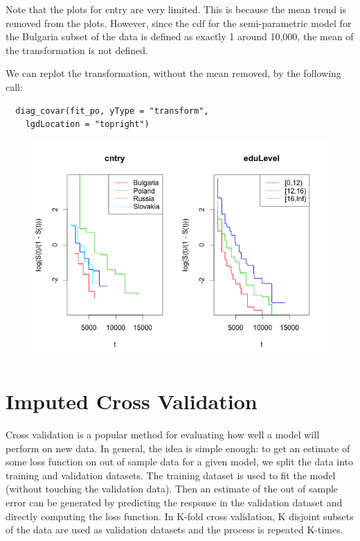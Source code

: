 \documentclass[11pt]{report}
\begin{document}
  Note that the plots for cntry are very limited. This is 
  because the mean trend is removed from the plots. However,
  since the cdf for the semi-parametric model for the 
  Bulgaria subset of the data is defined as exactly 1 around 
  10,000, the mean of the transformation is not defined. 
  
  We can replot the transformation, without the mean removed,
  by the following call:
  
  \begin{verbatim}
  diag_covar(fit_po, yType = "transform",
    lgdLocation = "topright")
  \end{verbatim}

  \begin{figure}
  \includegraphics{transformPlot.png}
  \label{figure:tranformKeepMean}
  \end{figure}


\section{Imputed Cross Validation}

  Cross validation is a popular method for evaluating how well a model will perform 
  on new data. In general, 
  the idea is simple enough: to get an estimate of some loss function on
  out of sample data for a given model, we split the data into training
  and validation datasets. The training dataset is used to fit the model
  (without touching the validation data). Then an estimate of the out of
  sample error can be generated by predicting the response in the validation
  dataset and directly computing the loss function. In K-fold cross validation,
  K disjoint subsets of the data are used as validation datasets and the process
  is repeated K-times. 
  
\end{document}
